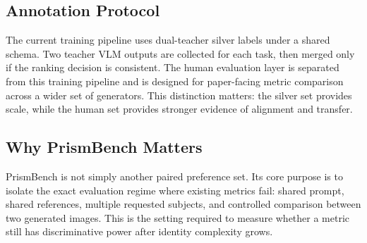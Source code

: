 \subsection{Annotation Protocol}
The current training pipeline uses dual-teacher silver labels under a shared schema. Two teacher VLM outputs are collected for each task, then merged only if the ranking decision is consistent. The human evaluation layer is separated from this training pipeline and is designed for paper-facing metric comparison across a wider set of generators. This distinction matters: the silver set provides scale, while the human set provides stronger evidence of alignment and transfer.

\subsection{Why PrismBench Matters}
PrismBench is not simply another paired preference set. Its core purpose is to isolate the exact evaluation regime where existing metrics fail: shared prompt, shared references, multiple requested subjects, and controlled comparison between two generated images. This is the setting required to measure whether a metric still has discriminative power after identity complexity grows.
